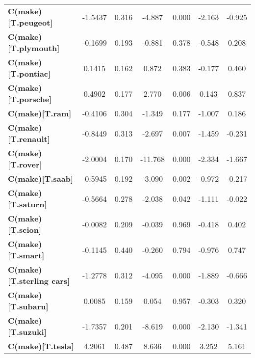 \begin{center}
\begin{tabular}{lcccccc}
\textbf{C(make)[T.peugeot]}       &      -1.5437  &        0.316     &    -4.887  &         0.000        &       -2.163    &       -0.925     \\
\textbf{C(make)[T.plymouth]}      &      -0.1699  &        0.193     &    -0.881  &         0.378        &       -0.548    &        0.208     \\
\textbf{C(make)[T.pontiac]}       &       0.1415  &        0.162     &     0.872  &         0.383        &       -0.177    &        0.460     \\
\textbf{C(make)[T.porsche]}       &       0.4902  &        0.177     &     2.770  &         0.006        &        0.143    &        0.837     \\
\textbf{C(make)[T.ram]}           &      -0.4106  &        0.304     &    -1.349  &         0.177        &       -1.007    &        0.186     \\
\textbf{C(make)[T.renault]}       &      -0.8449  &        0.313     &    -2.697  &         0.007        &       -1.459    &       -0.231     \\
\textbf{C(make)[T.rover]}         &      -2.0004  &        0.170     &   -11.768  &         0.000        &       -2.334    &       -1.667     \\
\textbf{C(make)[T.saab]}          &      -0.5945  &        0.192     &    -3.090  &         0.002        &       -0.972    &       -0.217     \\
\textbf{C(make)[T.saturn]}        &      -0.5664  &        0.278     &    -2.038  &         0.042        &       -1.111    &       -0.022     \\
\textbf{C(make)[T.scion]}         &      -0.0082  &        0.209     &    -0.039  &         0.969        &       -0.418    &        0.402     \\
\textbf{C(make)[T.smart]}         &      -0.1145  &        0.440     &    -0.260  &         0.794        &       -0.976    &        0.747     \\
\textbf{C(make)[T.sterling cars]} &      -1.2778  &        0.312     &    -4.095  &         0.000        &       -1.889    &       -0.666     \\
\textbf{C(make)[T.subaru]}        &       0.0085  &        0.159     &     0.054  &         0.957        &       -0.303    &        0.320     \\
\textbf{C(make)[T.suzuki]}        &      -1.7357  &        0.201     &    -8.619  &         0.000        &       -2.130    &       -1.341     \\
\textbf{C(make)[T.tesla]}         &       4.2061  &        0.487     &     8.636  &         0.000        &        3.252    &        5.161     \\

\end{tabular}
\end{center}
